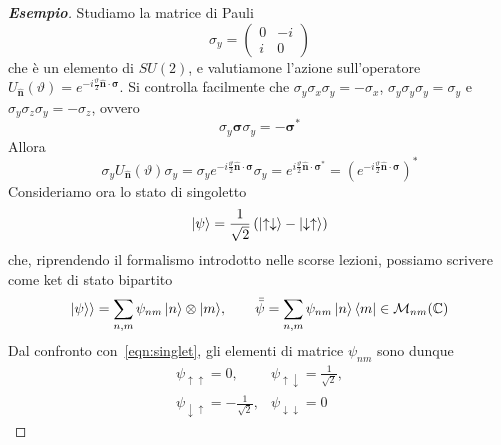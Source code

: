 \begin{proof}[\textbf{Esempio}]
Studiamo la matrice di Pauli 
\begin{equation}
\sigma_y=\begin{pmatrix}
0 & -i \\
i & 0
\end{pmatrix}
\end{equation}
che è un elemento di $SU(2)$, e valutiamone l'azione sull'operatore $U_{\hat{\textbf{n}}}(\vartheta)=e^{-i\frac{\vartheta}{2}\hat{\textbf{n}}\cdot\boldsymbol\sigma}$. Si controlla facilmente che $\sigma_y\sigma_x\sigma_y=-\sigma_x$, $\sigma_y\sigma_y\sigma_y=\sigma_y$ e $\sigma_y\sigma_z\sigma_y=-\sigma_z$, ovvero
\begin{equation}
\sigma_y\boldsymbol\sigma\sigma_y=-\boldsymbol\sigma^*
\end{equation}
Allora
\begin{equation}
\sigma_yU_{\hat{\textbf{n}}}(\vartheta)\sigma_y=\sigma_ye^{-i\frac{\vartheta}{2}\hat{\textbf{n}}\cdot\boldsymbol\sigma}\sigma_y=e^{i\frac{\vartheta}{2}\hat{\textbf{n}}\cdot\boldsymbol\sigma^*}=\left( e^{-i\frac{\vartheta}{2}\hat{\textbf{n}}\cdot\boldsymbol\sigma}\right)^*
\end{equation}
Consideriamo ora lo stato di singoletto
\begin{equation} \label{eqn:singlet}
\ket{\psi}=\frac{1}{\sqrt{2}}\left(\ket{\uparrow\downarrow}-\ket{\downarrow\uparrow}\right)
\end{equation}
che, riprendendo il formalismo introdotto nelle scorse lezioni, possiamo scrivere come ket di stato bipartito
\begin{equation}
\ket{\psi}\rangle=\sum_{n,m}{\psi_{nm}\ket{n}\otimes\ket{m}} %
,\qquad\bar{\bar{\psi}}=\sum_{n,m}{\psi_{nm}\ket{n}\bra{m}}\in\mathcal{M}_{nm}(\mathbb{C})
\end{equation}
Dal confronto con~\eqref{eqn:singlet}, gli elementi di matrice $\psi_{nm}$ sono dunque
\begin{equation}\begin{matrix}
\psi_{\uparrow\uparrow}=0,& \psi_{\uparrow\downarrow}=\frac{1}{\sqrt{2}},\\
\psi_{\downarrow\uparrow}=-\frac{1}{\sqrt{2}},&
\psi_{\downarrow\downarrow}=0
\end{matrix}\end{equation}

\end{proof}
